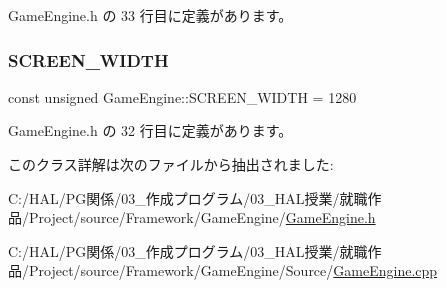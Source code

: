  Game\+Engine.\+h の 33 行目に定義があります。

\mbox{\label{class_game_engine_a6883e12a8088b16c8cbd348d25c5811a}} 
\subsubsection{\texorpdfstring{S\+C\+R\+E\+E\+N\+\_\+\+W\+I\+D\+TH}{SCREEN\_WIDTH}}
{\footnotesize\ttfamily const unsigned Game\+Engine\+::\+S\+C\+R\+E\+E\+N\+\_\+\+W\+I\+D\+TH = 1280\hspace{0.3cm}{\ttfamily [static]}}



 Game\+Engine.\+h の 32 行目に定義があります。



このクラス詳解は次のファイルから抽出されました\+:\begin{DoxyCompactItemize}
\item 
C\+:/\+H\+A\+L/\+P\+G関係/03\+\_\+作成プログラム/03\+\_\+\+H\+A\+L授業/就職作品/\+Project/source/\+Framework/\+Game\+Engine/\mbox{\hyperlink{_game_engine_8h}{Game\+Engine.\+h}}\item 
C\+:/\+H\+A\+L/\+P\+G関係/03\+\_\+作成プログラム/03\+\_\+\+H\+A\+L授業/就職作品/\+Project/source/\+Framework/\+Game\+Engine/\+Source/\mbox{\hyperlink{_game_engine_8cpp}{Game\+Engine.\+cpp}}\end{DoxyCompactItemize}

